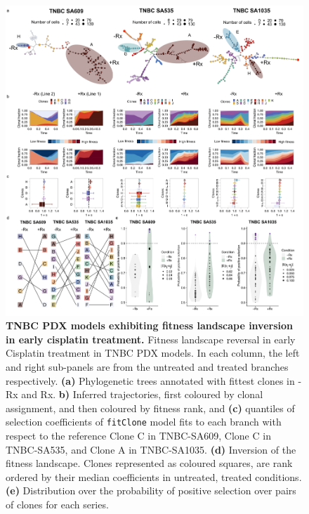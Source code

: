 \begin{figure}
\centering
\includegraphics[width=\textwidth]{Figures/chap4/landscapefitness.png}
	
\caption[Fitness landscape reversal in early cisplatin treatment in TNBC PDX models.]
	{\small
	\textbf{TNBC PDX models exhibiting fitness landscape inversion in early cisplatin treatment.}
	Fitness landscape reversal in early Cisplatin treatment in TNBC PDX models. In each column, the left and right sub-panels are from the untreated and treated branches respectively. \textbf{(a)} Phylogenetic trees annotated with fittest clones in -Rx and Rx. \textbf{b)} Inferred trajectories, first coloured by clonal assignment, and then coloured by fitness rank, and \textbf{(c)} quantiles of selection coefficients of \texttt{fitClone} model fits to each branch with respect to the reference Clone C in TNBC-SA609, Clone C in TNBC-SA535, and Clone A in TNBC-SA1035.
 \textbf{(d)} Inversion of the fitness landscape. Clones represented as coloured squares, are rank ordered by their median coefficients in untreated, treated conditions. 
\textbf{(e)} Distribution over the probability of positive selection over pairs of clones for each series.}   
	   
	
	\label{fig:landscapefitness}
\end{figure}

